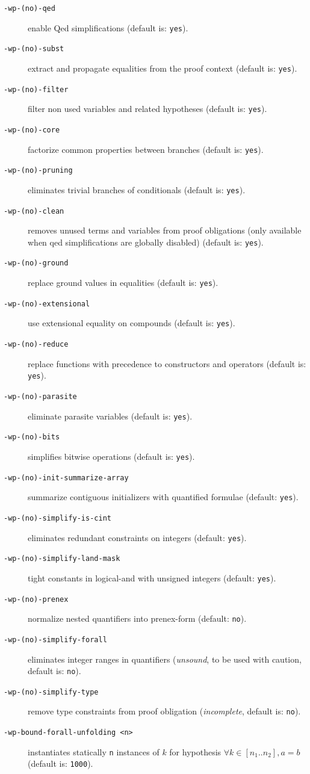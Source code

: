 \begin{description}
\item[\tt -wp-(no)-qed] enable Qed simplifications (default is: \texttt{yes}).
\item[\tt -wp-(no)-subst] extract and propagate equalities from the proof
  context (default is: \texttt{yes}).
\item[\tt -wp-(no)-filter] filter non used variables and related hypotheses
  (default is: \texttt{yes}).
\item[\tt -wp-(no)-core] factorize common properties between branches
  (default is: \texttt{yes}).
\item[\tt -wp-(no)-pruning] eliminates trivial branches of conditionals
  (default is: \texttt{yes}).
\item[\tt -wp-(no)-clean] removes unused terms and variables from
  proof obligations (only available when qed simplifications are globally
  disabled) (default is: \texttt{yes}).
\item[\tt -wp-(no)-ground] replace ground values in equalities
  (default is: \texttt{yes}).
\item[\tt -wp-(no)-extensional] use extensional equality on compounds
  (default is: \texttt{yes}).
\item[\tt -wp-(no)-reduce] replace functions with precedence to constructors and
  operators (default is: \texttt{yes}).
\item[\tt -wp-(no)-parasite] eliminate parasite variables
  (default is: \texttt{yes}).
\item[\tt -wp-(no)-bits] simplifies bitwise operations
  (default is: \texttt{yes}).
\item[\tt -wp-(no)-init-summarize-array] summarize contiguous initializers
  with quantified formulae (default: \texttt{yes}).
\item[\tt -wp-(no)-simplify-is-cint] eliminates redundant constraints on integers
  (default: \texttt{yes}).
\item[\tt -wp-(no)-simplify-land-mask] tight constants in logical-and with
  unsigned integers (default: \texttt{yes}).
\item[\tt -wp-(no)-prenex] normalize nested quantifiers into prenex-form
  (default: \texttt{no}).
\item[\tt -wp-(no)-simplify-forall] eliminates integer ranges in quantifiers
  (\emph{unsound}, to be used with caution, default is: \texttt{no}).
\item[\tt -wp-(no)-simplify-type] remove type constraints from proof obligation
  (\emph{incomplete}, default is: \texttt{no}).
\item[\tt -wp-bound-forall-unfolding <n>] instantiates statically \texttt{n}
  instances of $k$ for hypothesis $\forall k \in [n_1..n_2], a = b$
  (default is: \texttt{1000}).
\end{description}

